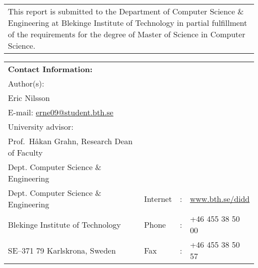 {\pagestyle{empty}
\changepage{5cm}{1cm}{-0.5cm}{-0.5cm}{}{-2cm}{}{}{}
\noindent%
\begin{tabular}{p{\textwidth}}
{\small This report is submitted to the Department of Computer Science \& Engineering at Blekinge
Institute of Technology in partial fulfillment of the requirements for the degree of Master
of Science in Computer Science.}
\end{tabular}

\par\vspace{10cm}

\noindent%
\begin{tabular}{p{}lcl}
\textbf{Contact Information:}\\
Author(s):\\
Eric Nilsson\\
E-mail: \href{mailto:erne09@student.bth.se}{erne09@student.bth.se} \\ %
\par\vspace {5cm}
University advisor:\\
Prof.\ Håkan Grahn, Research Dean of Faculty\\
Dept. Computer Science \& Engineering

\par\vspace {1cm}

\noindent%
 \\
Dept. Computer Science \& Engineering & Internet & : & \href{http://www.bth.se/didd}{www.bth.se/didd}\\
Blekinge Institute of Technology & Phone	& : & +46 455 38 50 00 \\
SE--371 79 Karlskrona, Sweden & Fax & : & +46 455 38 50 57 \\
\end{tabular}
\clearpage
} %

\setcounter{page}{1}
